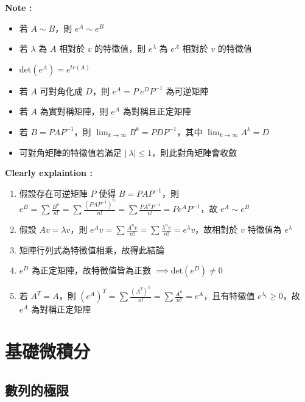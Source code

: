 \documentclass[
]{book}
\providecommand{\tightlist}{%
  \setlength{\itemsep}{0pt}\setlength{\parskip}{0pt}}
\begin{document}
\textbf{Note :}

\begin{itemize}
\tightlist
\item
  若 \(A \sim B\)，則 \(e^A \sim e^B\)
\item
  若 \(\lambda\) 為 \(A\) 相對於 \(v\) 的特徵值，則 \(e^{\lambda}\) 為 \(e^A\) 相對於 \(v\) 的特徵值
\item
  \(\mbox{det}(e^A) = e^{tr(A)}\)
\item
  若 \(A\) 可對角化成 \(D\)，則 \(e^A = P\ e^DP^{-1}\) 為可逆矩陣
\item
  若 \(A\) 為實對稱矩陣，則 \(e^A\) 為對稱且正定矩陣
\item
  若 \(B = PAP^{-1}\)，則 \(\displaystyle \lim_{k \to \infty}B^k = PDP^{-1}\)，其中 \(\displaystyle\lim_{k \to \infty}A^k = D\)
\item
  可對角矩陣的特徵值若滿足 \(\mid\ \lambda\mid \leq 1\)，則此對角矩陣會收斂
\end{itemize}

\textbf{Clearly explaintion :}

\begin{enumerate}
\def\labelenumi{\arabic{enumi}.}
\tightlist
\item
  假設存在可逆矩陣 \(P\) 使得 \(B = PAP^{-1}\)，則 \(e^B = \sum\frac{B^n}{n!} = \sum\frac{(PAP^{-1})^n}{n!} = \sum\frac{PA^nP^{-1}}{n!} = Pe^AP^{-1}\)，故 \(e^A \sim e^B\)
\item
  假設 \(Av = \lambda v\)，則 \(e^Av = \sum\frac{A^nv}{n!} = \sum \frac{\lambda^nv}{n!} = e^{\lambda}v\)，故相對於 \(v\) 特徵值為 \(e^{\lambda}\)
\item
  矩陣行列式為特徵值相乘，故得此結論
\item
  \(e^D\) 為正定矩陣，故特徵值皆為正數 \(\implies \mbox{det}(e^D) \neq 0\)
\item
  若 \(A^T = A\)，則 \((e^A)^T = \sum \frac{(A^T)^n}{n!} = \sum \frac{A^n}{n!} = e^A\)，且有特徵值 \(e^{\lambda_i} \geq 0\)，故 \(e^A\) 為對稱正定矩陣
\end{enumerate}

\hypertarget{ux57faux790eux5faeux7a4dux5206}{%
\chapter{基礎微積分}\label{ux57faux790eux5faeux7a4dux5206}}

\hypertarget{ux6578ux5217ux7684ux6975ux9650}{%
\section{數列的極限}\label{ux6578ux5217ux7684ux6975ux9650}}
\end{document}
